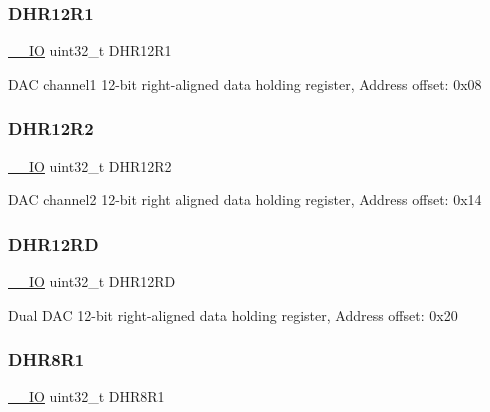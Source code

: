 \subsubsection{\texorpdfstring{D\+H\+R12\+R1}{DHR12R1}}
{\footnotesize\ttfamily \mbox{\hyperlink{core__sc300_8h_aec43007d9998a0a0e01faede4133d6be}{\+\_\+\+\_\+\+IO}} uint32\+\_\+t D\+H\+R12\+R1}

D\+AC channel1 12-\/bit right-\/aligned data holding register, Address offset\+: 0x08 \mbox{\label{struct_d_a_c___type_def_a804c7e15dbb587c7ea25511f6a7809f7}} 
\subsubsection{\texorpdfstring{D\+H\+R12\+R2}{DHR12R2}}
{\footnotesize\ttfamily \mbox{\hyperlink{core__sc300_8h_aec43007d9998a0a0e01faede4133d6be}{\+\_\+\+\_\+\+IO}} uint32\+\_\+t D\+H\+R12\+R2}

D\+AC channel2 12-\/bit right aligned data holding register, Address offset\+: 0x14 \mbox{\label{struct_d_a_c___type_def_a1590b77e57f17e75193da259da72095e}} 
\subsubsection{\texorpdfstring{D\+H\+R12\+RD}{DHR12RD}}
{\footnotesize\ttfamily \mbox{\hyperlink{core__sc300_8h_aec43007d9998a0a0e01faede4133d6be}{\+\_\+\+\_\+\+IO}} uint32\+\_\+t D\+H\+R12\+RD}

Dual D\+AC 12-\/bit right-\/aligned data holding register, Address offset\+: 0x20 \mbox{\label{struct_d_a_c___type_def_ad0a200e12acad17a5c7d2059159ea7e1}} 
\subsubsection{\texorpdfstring{D\+H\+R8\+R1}{DHR8R1}}
{\footnotesize\ttfamily \mbox{\hyperlink{core__sc300_8h_aec43007d9998a0a0e01faede4133d6be}{\+\_\+\+\_\+\+IO}} uint32\+\_\+t D\+H\+R8\+R1}

